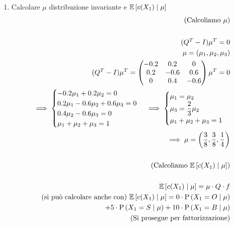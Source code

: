 \begin{enumerate}
	\item Calcolare $\mu$ distribuzione invariante e $\mathbb{E}\left[c(X_1) \mid \mu\right]$
\begin{equation*}
	\begin{aligned}
	(\text{Calcoliamo } \mu )\\ \\
	(Q^T - I) \mu^T = 0 \\
	\mu = (\mu_1, \mu_2, \mu_3) \\
	(Q^T - I)\mu^T = \begin{pmatrix}
	-0.2 & 0.2 & 0 \\ 
	0.2 & -0.6 & 0.6 \\
	0 & 0.4 & -0.6
	\end{pmatrix} \mu^T = 0 \\
	\implies \begin{cases}
	-0.2 \mu_1 + 0.2 \mu_2 = 0 \\
	0.2 \mu_1 - 0.6 \mu_2 + 0.6 \mu_3 = 0 \\
	 0.4 \mu_2 - 0.6 \mu_3 = 0 \\
	 \mu_1 + \mu_2 + \mu_3 = 1
	\end{cases} 
	\implies \begin{cases}
	\mu_1 = \mu_2 \\
	\mu_3 = \dfrac{2}{3} \mu_2 \\
 	\mu_1 + \mu_2 + \mu_3 = 1
	\end{cases} \\
	\implies \mu = \left(\dfrac{3}{8}, \dfrac{3}{8}, \dfrac{1}{4}\right) \\ \\
	(\text{Calcoliamo } \mathbb{E}\left[c(X_1) \mid \mu\right]) \\ \\
	\mathbb{E}\left[c(X_1) \mid \mu\right] = \mu \cdot Q \cdot f \\
	\text{(si può calcolare anche con) }
	\mathbb{E}\left[c(X_1) \mid \mu\right] =0 \cdot \text{P}\left(X_1 = O \mid \mu\right) \\
	+ 5 \cdot \text{P}\left(X_1 = S \mid \mu\right) + 10 \cdot \text{P}\left(X_1 = B \mid \mu\right) \\
	\text{(Si prosegue per fattorizzazione)}
	\end{aligned} 
\end{equation*}
\end{enumerate}

